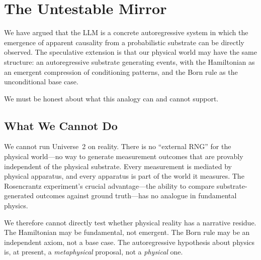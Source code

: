 \documentclass[12pt,a4paper]{article}
\theoremstyle{definition}
\theoremstyle{remark}
\begin{document}
\section{The Untestable Mirror}
\label{sec:mirror}

We have argued that the LLM is a concrete autoregressive system
in which the emergence of apparent causality from a probabilistic
substrate can be directly observed.  The speculative extension is
that our physical world may have the same structure: an
autoregressive substrate generating events, with the Hamiltonian
as an emergent compression of conditioning patterns, and the Born
rule as the unconditional base case.

We must be honest about what this analogy can and cannot support.

\subsection{What We Cannot Do}

We cannot run Universe~2 on reality.  There is no ``external RNG''
for the physical world---no way to generate measurement outcomes
that are provably independent of the physical substrate.  Every
measurement is mediated by physical apparatus, and every apparatus
is part of the world it measures.  The Rosencrantz experiment's
crucial advantage---the ability to compare substrate-generated
outcomes against ground truth---has no analogue in fundamental
physics.

We therefore cannot directly test whether physical reality has a
narrative residue.  The Hamiltonian may be fundamental, not emergent.
The Born rule may be an independent axiom, not a base case.  The
autoregressive hypothesis about physics is, at present, a
\emph{metaphysical} proposal, not a \emph{physical} one.
\end{document}
